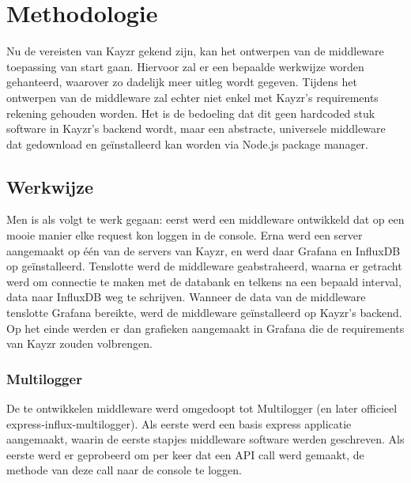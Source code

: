 \chapter{Methodologie}
\label{ch:methodologie}


Nu de vereisten van Kayzr gekend zijn, kan het ontwerpen van de middleware toepassing van start gaan. Hiervoor zal er een bepaalde werkwijze worden gehanteerd, waarover zo dadelijk meer uitleg wordt gegeven. Tijdens het ontwerpen van de middleware zal echter niet enkel met Kayzr's requirements rekening gehouden worden. Het is de bedoeling dat dit geen hardcoded stuk software in Kayzr's backend wordt, maar een abstracte, universele middleware dat gedownload en geïnstalleerd kan worden via Node.js package manager.  

\section{Werkwijze}
\label{sec:werkwijze}

Men is als volgt te werk gegaan: eerst werd een middleware ontwikkeld dat op een mooie manier elke request kon loggen in de console. Erna werd een server aangemaakt op één van de servers van Kayzr, en werd daar Grafana en InfluxDB op geïnstalleerd. Tenslotte werd de middleware geabstraheerd, waarna er getracht werd om connectie te maken met de databank en telkens na een bepaald interval, data naar InfluxDB weg te schrijven. Wanneer de data van de middleware tenslotte Grafana bereikte, werd de middleware geïnstalleerd op Kayzr's backend. Op het einde werden er dan grafieken aangemaakt in Grafana die de requirements van Kayzr zouden volbrengen. 

\subsection{Multilogger}
\label{sec:multilogger}

De te ontwikkelen middleware werd omgedoopt tot Multilogger (en later officieel express-influx-multilogger). Als eerste werd een basis express applicatie aangemaakt, waarin de eerste stapjes middleware software werden geschreven. Als eerste werd er geprobeerd om per keer dat een API call werd gemaakt, de methode van deze call naar de console te loggen.

